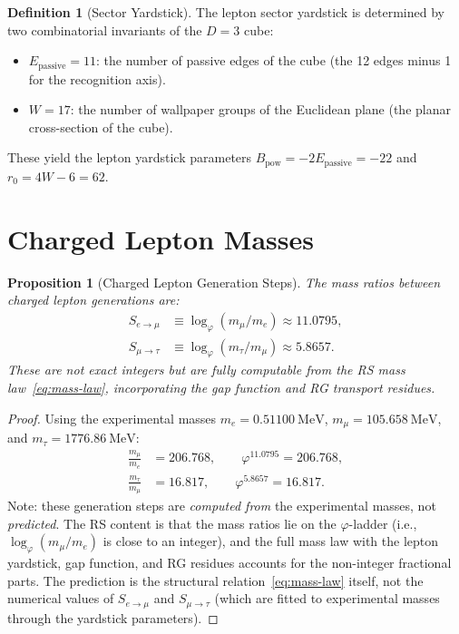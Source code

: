 \documentclass[12pt,a4paper]{article}
\newtheorem{proposition}[theorem]{Proposition}
\theoremstyle{definition}
\newtheorem{definition}[theorem]{Definition}
\theoremstyle{remark}
\begin{document}
\begin{definition}[Sector Yardstick]
\label{def:yardstick}
The lepton sector yardstick is determined by two combinatorial
invariants of the $D = 3$ cube:
\begin{itemize}
  \item $E_{\mathrm{passive}} = 11$: the number of passive
  edges of the cube (the 12 edges minus 1 for the recognition
  axis).
  \item $W = 17$: the number of wallpaper groups of the
  Euclidean plane (the planar cross-section of the cube).
\end{itemize}
These yield the lepton yardstick parameters
$B_{\mathrm{pow}} = -2E_{\mathrm{passive}} = -22$ and
$r_0 = 4W - 6 = 62$.
\end{definition}

\section{Charged Lepton Masses}
\label{sec:leptons}

\begin{proposition}[Charged Lepton Generation Steps]
\label{prop:lepton-steps}
The mass ratios between charged lepton generations are:
\begin{align}
  S_{e \to \mu} &\equiv \log_\varphi(m_\mu / m_e)
  \approx 11.0795, \label{eq:step-emu} \\
  S_{\mu \to \tau} &\equiv \log_\varphi(m_\tau / m_\mu)
  \approx 5.8657. \label{eq:step-mutau}
\end{align}
These are \emph{not} exact integers but are fully computable
from the RS mass law~\eqref{eq:mass-law}, incorporating the
gap function and RG transport residues.
\end{proposition}

\begin{proof}
Using the experimental masses $m_e = 0.51100~\mathrm{MeV}$,
$m_\mu = 105.658~\mathrm{MeV}$, and
$m_\tau = 1776.86~\mathrm{MeV}$:
\begin{align}
  \frac{m_\mu}{m_e} &= 206.768, \qquad
  \varphi^{11.0795} = 206.768, \\
  \frac{m_\tau}{m_\mu} &= 16.817, \qquad
  \varphi^{5.8657} = 16.817.
\end{align}
Note: these generation steps are \emph{computed from} the experimental
masses, not \emph{predicted}.  The RS content is that the mass ratios
lie on the $\varphi$-ladder (i.e., $\log_\varphi(m_\mu/m_e)$ is close
to an integer), and the full mass law with the lepton yardstick, gap
function, and RG residues accounts for the non-integer fractional parts.
The prediction is the structural relation~\eqref{eq:mass-law} itself,
not the numerical values of $S_{e \to \mu}$ and $S_{\mu \to \tau}$
(which are fitted to experimental masses through the yardstick parameters).
\end{proof}
\end{document}
